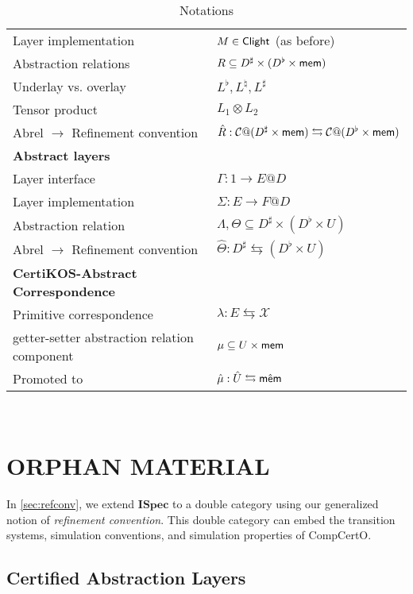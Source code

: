 \documentclass[acmsmall,review,anonymous]{acmart}\settopmatter{printfolios=true,printccs=false,printacmref=false}
\newcommand{\ISpec}{\mathbf{ISpec}}
\begin{document}
\begin{table}
\begin{tabular}{ll}
    Layer implementation & $M \in  \mathsf{Clight} $ (as before) \\
    Abstraction relations & $R \subseteq D^\sharp \times (D^\flat \times  \mathsf{mem} )$ \\
    Underlay vs. overlay & $L^\flat, L^\natural, L^\sharp$ \\
    Tensor product & $L_1 \otimes L_2$ \\
    Abrel $\rightarrow$ Refinement convention &
      $\hat{R} : \mathcal{C}@(D^\sharp \times  \mathsf{mem} ) \leftrightarrows
             \mathcal{C}@(D^\flat  \times  \mathsf{mem} )$ \\
    \hline
    \textbf{Abstract layers} \\
    Layer interface & $\Gamma : 1 \rightarrow E@D$ \\
    Layer implementation & $\Sigma : E \rightarrow F@D$ \\
    Abstraction relation & $\Lambda, \Theta \subseteq D^\sharp \times (D^\flat \times U)$ \\
    Abrel $\rightarrow$ Refinement convention &
      $\hat{\Theta} : D^\sharp \leftrightarrows
             (D^\flat  \times U)$ \\
    \hline
    \textbf{CertiKOS-Abstract Correspondence} \\
    Primitive correspondence & $\lambda : E \leftrightarrows \mathcal{X}$ \\
    getter-setter abstraction relation component &
      $\mu \subseteq U \times  \mathsf{mem}  $ \\
    Promoted to & $\hat{\mu} : \hat{U} \leftrightarrows \hat{ \mathsf{mem} }$ \\
    \hline
  \end{tabular}
  \\
  \caption{Notations}
\end{table}

\section*{ORPHAN MATERIAL} %

In \autoref{sec:refconv},
we extend $\ISpec$ to a double category
using our generalized notion of \emph{refinement convention}.
This double category can embed
the transition systems,
simulation conventions, and
simulation properties of CompCertO.

\subsection*{Certified Abstraction Layers}\label{sec:mainideas:cal} %
\end{document}
